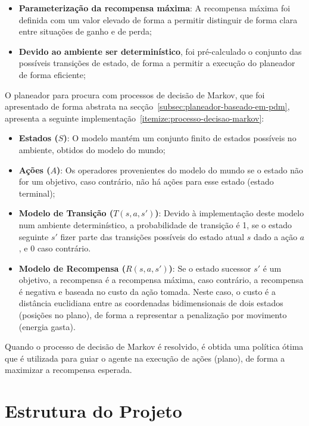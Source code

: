 \begin{itemize}
    \item \textbf{Parameterização da recompensa máxima}: A recompensa máxima foi definida com um valor elevado de forma a permitir distinguir de forma clara entre situações de ganho e de perda;
    \item \textbf{Devido ao ambiente ser determinístico}, foi pré-calculado o conjunto das possíveis transições de estado, de forma a permitir a execução do planeador de forma eficiente;
\end{itemize}

O planeador para procura com processos de decisão de Markov, que foi apresentado de forma abstrata na secção~\ref{subsec:planeador-baseado-em-pdm},
apresenta a seguinte implementação~\ref{itemize:processo-decisao-markov}:

\begin{itemize}
    \item \textbf{Estados (\(S\))}: O modelo mantém um conjunto finito de estados possíveis no ambiente, obtidos do modelo do mundo;
    \item \textbf{Ações (\(A\))}: Os operadores provenientes do modelo do mundo se o estado não for um objetivo, caso contrário, não há ações para esse estado (estado terminal);
    \item \textbf{Modelo de Transição (\(T(s, a, s')\))}: Devido à implementação deste modelo num ambiente determinístico, a probabilidade de transição é 1, se o estado seguinte \(s'\) fizer parte das transições possíveis do estado atual \(s\) dado a ação \(a\), e 0 caso contrário.
    \item \textbf{Modelo de Recompensa (\(R(s, a, s')\))}: Se o estado sucessor \(s'\) é um objetivo, a recompensa é a recompensa máxima, caso contrário, a recompensa é negativa e baseada no custo da ação tomada.
    Neste caso, o custo é a distância euclidiana entre as coordenadas bidimensionais de dois estados (posições no plano), de forma a representar a penalização por movimento (energia gasta).
\end{itemize}

Quando o processo de decisão de Markov é resolvido, é obtida uma política ótima que é utilizada para guiar o agente na execução de ações (plano), de forma a maximizar a recompensa esperada.

\section{Estrutura do Projeto}\label{sec:estrutura-do-projeto-4}

